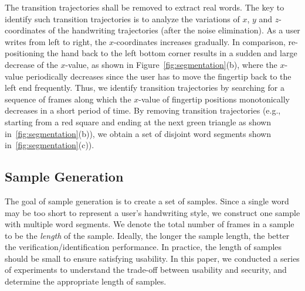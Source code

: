 
 
The transition trajectories shall be removed to extract real words. The key to identify such transition trajectories is to analyze the variations of $x$, $y$ and $z$-coordinates of
the handwriting trajectories (after the noise elimination). As a user writes from  left to right, the $x$-coordinates increases gradually. In comparison, re-positioning the hand back to the left bottom corner results in a sudden and large decrease of the $x$-value, as shown in Figure~\ref{fig:segmentation}(b), 
where the $x$-value periodically decreases since the user has to move the fingertip back to the left end frequently.
Thus, we identify transition trajectories by searching for a sequence of frames along which the $x$-value of fingertip positions monotonically decreases in a short period of time. By removing transition trajectories (e.g., starting from a red square and ending at the next green triangle as shown in~\ref{fig:segmentation}(b)), 
we obtain a set of disjoint word segments shown in~\ref{fig:segmentation}(c)). 




\subsection{Sample Generation}
\label{subsec:sample}

The goal of sample generation is to create a set of samples. 
Since a single word may be too short to represent a user's handwriting style, we construct one sample with multiple word segments. %
We denote the total number of frames in a sample to be the \emph{length} of the sample. Ideally, the longer the sample length, the better the verification/identification performance. 
In practice, the length of samples should be small to ensure satisfying usability. In this paper, we conducted a series of experiments to understand the trade-off between usability and security, and determine the appropriate length of samples.

